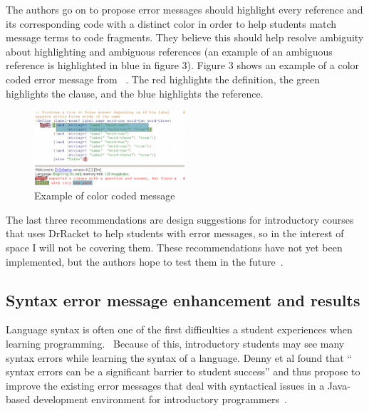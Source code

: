\documentclass{sig-alternate}
\begin{document}
The authors go on to propose error messages should highlight every reference and its corresponding code with a distinct color in order to help students match message terms to code fragments.
They believe this should help resolve ambiguity about highlighting and ambiguous references (an example of an ambiguous reference is highlighted in blue in figure 3).
Figure 3 shows an example of a color coded error message from ~\cite{Marceau:2011:MYL:2048237.2048241}.
The red highlights the definition, the green highlights the clause, and the blue highlights the reference.

\begin{figure}
  \centering
  \includegraphics[keepaspectratio, width=0.5\textwidth]{DrRacketColorCodedMessage.png}
  \caption{Example of color coded message}
  \label{fig:colorcodedmessage}
\end{figure}

The last three recommendations are design suggestions for introductory courses that uses DrRacket to help students with error messages, so in the interest of space I will not be covering them.
These recommendations have not yet been implemented, but the authors hope to test them in the future~\cite{Marceau:2011:MYL:2048237.2048241}. 



\subsection{Syntax error message enhancement and results}\label{subsec:syntax enhancement}

Language syntax is often one of the first difficulties a student experiences when learning programming.~\cite{Denny:2011:USB:1999747.1999807}
Because of this, introductory students may see many syntax errors while learning the syntax of a language.
Denny et al found that `` syntax errors can be a significant barrier to student success'' and thus propose to improve the existing error messages that deal with syntactical issues in a Java-based development environment for introductory programmers~\cite{Denny:2014:ESE:2591708.2591748}.
\end{document}
